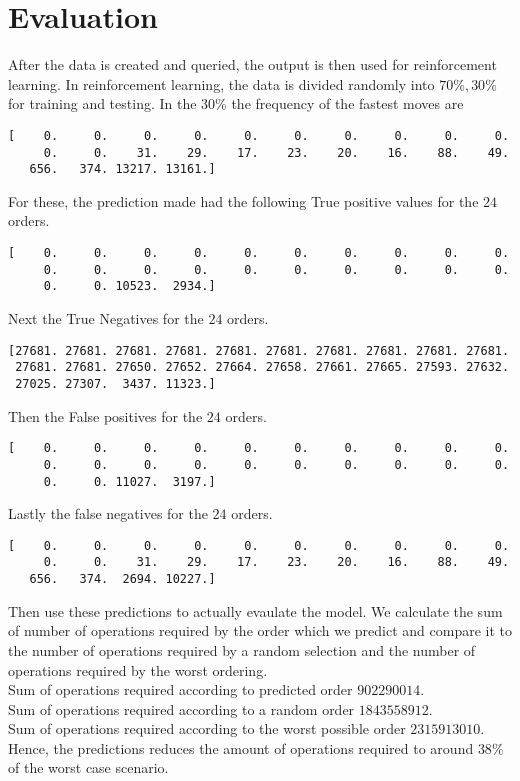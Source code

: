 \chapter{Evaluation}
\label{chapter:evaluation}
\thispagestyle{myheadings}

\graphicspath{}

After the data is created and queried, the output is then used for reinforcement learning. In reinforcement learning, the data is divided randomly into $70\%,30\%$ for training and testing. In the $30\%$ the frequency of the fastest moves are
\begin{lstlisting}
[    0.     0.     0.     0.     0.     0.     0.     0.     0.     0.
     0.     0.    31.    29.    17.    23.    20.    16.    88.    49.
   656.   374. 13217. 13161.]
\end{lstlisting}
For these, the prediction made had the following True positive values for the $24$ orders.
\begin{lstlisting}
[    0.     0.     0.     0.     0.     0.     0.     0.     0.     0.
     0.     0.     0.     0.     0.     0.     0.     0.     0.     0.
     0.     0. 10523.  2934.]
\end{lstlisting}
Next the True Negatives for the $24$ orders.
\begin{lstlisting}
[27681. 27681. 27681. 27681. 27681. 27681. 27681. 27681. 27681. 27681.
 27681. 27681. 27650. 27652. 27664. 27658. 27661. 27665. 27593. 27632.
 27025. 27307.  3437. 11323.]
\end{lstlisting}
Then the False positives for the $24$ orders.
\begin{lstlisting}
[    0.     0.     0.     0.     0.     0.     0.     0.     0.     0.
     0.     0.     0.     0.     0.     0.     0.     0.     0.     0.
     0.     0. 11027.  3197.]
\end{lstlisting}
Lastly the false negatives for the $24$ orders.
\begin{lstlisting}
[    0.     0.     0.     0.     0.     0.     0.     0.     0.     0.
     0.     0.    31.    29.    17.    23.    20.    16.    88.    49.
   656.   374.  2694. 10227.]
\end{lstlisting}
Then use these predictions to actually evaulate the model. We calculate the sum of number of operations required by the order which we predict and compare it to the number of operations required by a random selection and the number of operations required by the worst ordering.\\
Sum of operations required according to predicted order $902290014$.\\
Sum of operations required according to a random order  $1843558912$.\\
Sum of operations required according to the worst possible order $2315913010$.\\
Hence, the predictions reduces the amount of operations required to around $38\%$ of the worst case scenario.
